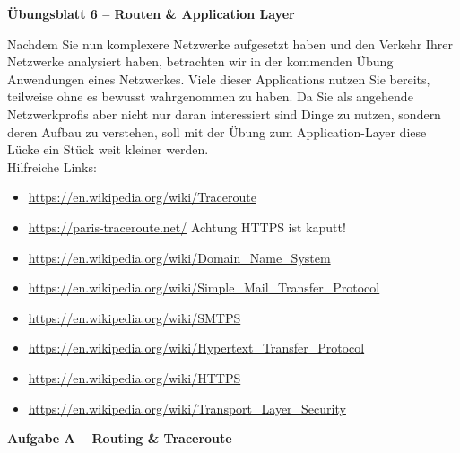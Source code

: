 \documentclass[paper=a4,fontsize=11pt]{scrartcl}%
\numberwithin{equation}{section}
\begin{document}
\begin{center}
\Large{\textbf{Übungsblatt 6 -- Routen \& Application Layer}}
\end{center}
Nachdem Sie nun komplexere Netzwerke aufgesetzt haben und den Verkehr Ihrer Netzwerke analysiert haben, betrachten wir in der kommenden Übung Anwendungen eines Netzwerkes. Viele dieser Applications nutzen Sie bereits, teilweise ohne es bewusst wahrgenommen zu haben. Da Sie als angehende Netzwerkprofis aber nicht nur daran interessiert sind Dinge zu nutzen, sondern deren Aufbau zu verstehen, soll mit der Übung zum Application-Layer diese Lücke ein Stück weit kleiner werden.\\  
Hilfreiche Links:
\begin{itemize}
	\item \url{https://en.wikipedia.org/wiki/Traceroute}
	\item \url{https://paris-traceroute.net/} Achtung HTTPS ist kaputt!
	\item \url{https://en.wikipedia.org/wiki/Domain_Name_System}
	\item \url{https://en.wikipedia.org/wiki/Simple_Mail_Transfer_Protocol}
	\item \url{https://en.wikipedia.org/wiki/SMTPS}
	\item \url{https://en.wikipedia.org/wiki/Hypertext_Transfer_Protocol}
	\item \url{https://en.wikipedia.org/wiki/HTTPS}
	\item \url{https://en.wikipedia.org/wiki/Transport_Layer_Security}
\end{itemize}
\begin{center}\Large{\textbf{Aufgabe A -- Routing \& Traceroute}}\end{center}\vskip0.25in
\end{document}
